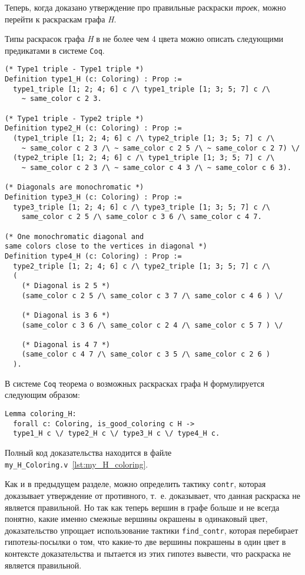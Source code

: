 Теперь, когда доказано утверждение про правильные раскраски {\it троек}, можно перейти к раскраскам графа {\it H}.

Типы раскрасок графа {\it H} в не более чем 4 цвета можно описать следующими предикатами в системе {\tt Coq}.

\begin{verbatim}
(* Type1 triple - Type1 triple *)
Definition type1_H (c: Coloring) : Prop :=
  type1_triple [1; 2; 4; 6] c /\ type1_triple [1; 3; 5; 7] c /\
    ~ same_color c 2 3.

(* Type1 triple - Type2 triple *)
Definition type2_H (c: Coloring) : Prop :=
  (type1_triple [1; 2; 4; 6] c /\ type2_triple [1; 3; 5; 7] c /\
    ~ same_color c 2 3 /\ ~ same_color c 2 5 /\ ~ same_color c 2 7) \/
  (type2_triple [1; 2; 4; 6] c /\ type1_triple [1; 3; 5; 7] c /\
    ~ same_color c 2 3 /\ ~ same_color c 4 3 /\ ~ same_color c 6 3).

(* Diagonals are monochromatic *)
Definition type3_H (c: Coloring) : Prop :=
  type3_triple [1; 2; 4; 6] c /\ type3_triple [1; 3; 5; 7] c /\
    same_color c 2 5 /\ same_color c 3 6 /\ same_color c 4 7.

(* One monochromatic diagonal and 
same colors close to the vertices in diagonal *)
Definition type4_H (c: Coloring) : Prop :=
  type2_triple [1; 2; 4; 6] c /\ type2_triple [1; 3; 5; 7] c /\
  (
    (* Diagonal is 2 5 *) 
    (same_color c 2 5 /\ same_color c 3 7 /\ same_color c 4 6 ) \/

    (* Diagonal is 3 6 *) 
    (same_color c 3 6 /\ same_color c 2 4 /\ same_color c 5 7 ) \/

    (* Diagonal is 4 7 *) 
    (same_color c 4 7 /\ same_color c 3 5 /\ same_color c 2 6 )
  ).
\end{verbatim}

В системе {\tt Coq} теорема о возможных раскрасках графа {\tt H} формулируется следующим образом:

\begin{verbatim}
Lemma coloring_H:
  forall c: Coloring, is_good_coloring c H ->
  type1_H c \/ type2_H c \/ type3_H c \/ type4_H c.
\end{verbatim}

Полный код доказательства находится в файле {\tt my\_H\_Coloring.v}~\ref{lst:my_H_coloring}.

Как и в предыдущем разделе, можно определить тактику {\tt contr}, которая доказывает утверждение от противного, т.~е. доказывает, что данная раскраска не является правильной. Но так как теперь вершин в графе больше и не всегда понятно, какие именно смежные вершины окрашены в одинаковый цвет, доказательство упрощает использование тактики {\tt find\_contr}, которая перебирает гипотезы-посылки о том, что какие-то две вершины покрашены в один цвет в контексте доказательства и пытается из этих гипотез вывести, что раскраска не является правильной. 


